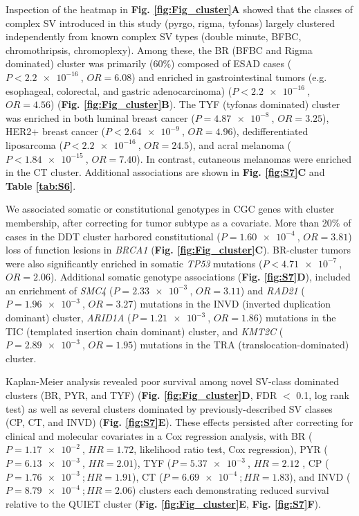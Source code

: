 \documentclass[phd,tocprelim]{cornell}
\begin{document}
Inspection of the heatmap in \textbf{Fig. \ref{fig:Fig_cluster}A} showed that the classes of complex SV introduced in this study (pyrgo, rigma, tyfonas) largely clustered independently from known complex SV types (double minute, BFBC, chromothripsis, chromoplexy). Among these, the BR (BFBC and Rigma dominated) cluster was primarily (60\%) composed of ESAD cases ($P < \SI{2.2e-16}{}$, $OR = 6.08$) and enriched in gastrointestinal tumors (e.g. esophageal, colorectal, and gastric adenocarcinoma) ($P < \SI{2.2e-16}{}$, $OR = 4.56$) (\textbf{Fig. \ref{fig:Fig_cluster}B}).  The TYF (tyfonas dominated) cluster was enriched in both luminal breast cancer ($P = \SI{4.87e-8}{}$, $OR = 3.25$),  HER2+ breast cancer ($P < \SI{2.64e-9}{}$, $OR = 4.96$), dedifferentiated liposarcoma ($P < \SI{2.2e-16}{}$, $OR = 24.5$), and acral melanoma ($P < \SI{1.84e-15}{}$, $OR = 7.40$). In contrast, cutaneous melanomas were enriched in the CT cluster.  Additional associations are shown in \textbf{Fig. \ref{fig:S7}C} and \textbf{Table \ref{tab:S6}}.

We associated somatic or constitutional genotypes in CGC genes with cluster membership, after correcting for tumor subtype as a covariate. More than 20\% of cases in the DDT cluster harbored constitutional ($P = \SI{1.60e-4}{}$, $OR = 3.81$) loss of function lesions in \textit{BRCA1} (\textbf{Fig. \ref{fig:Fig_cluster}C}). BR-cluster tumors were also significantly enriched in somatic \textit{TP53} mutations ($P < \SI{4.71e-7}{}$, $OR = 2.06$). Additional somatic genotype associations (\textbf{Fig. \ref{fig:S7}D}), included an enrichment of \textit{SMC4} ($P = \SI{2.33e-3}{}$, $OR = 3.11$) and \textit{RAD21} ($P = \SI{1.96e-3}{}$, $OR = 3.27$) mutations in the INVD (inverted duplication dominant) cluster, \textit{ARID1A} ($P = \SI{1.21e-3}{}$, $OR = 1.86$) mutations in the TIC (templated insertion chain dominant) cluster, and \textit{KMT2C} ($P = \SI{2.89e-3}{}$, $OR = 1.95$) mutations in the TRA (translocation-dominated) cluster.

Kaplan-Meier analysis revealed poor survival among novel SV-class dominated clusters (BR, PYR, and TYF) (\textbf{Fig. \ref{fig:Fig_cluster}D}, FDR $<$ 0.1, log rank test) as well as several clusters dominated by previously-described SV classes (CP, CT, and INVD) (\textbf{Fig. \ref{fig:S7}E}).  These effects persisted after correcting for clinical and molecular covariates in a Cox regression analysis, with BR ($P = \SI{1.17e-2}{}$, $HR = 1.72$, likelihood ratio test, Cox regression), PYR ($P = \SI{6.13e-3}{}$, $HR = 2.01$), TYF ($P = \SI{5.37e-3}{}$, $HR = 2.12$ , CP ($P = \SI{1.76e-3}{}; HR = 1.91$), CT ($P = \SI{6.69e-4}{}; HR = 1.83$), and INVD ($P = \SI{8.79e-4}{}; HR = 2.06$) clusters each demonstrating reduced survival relative to the QUIET cluster (\textbf{Fig. \ref{fig:Fig_cluster}E}, \textbf{Fig. \ref{fig:S7}F}).
\end{document}
